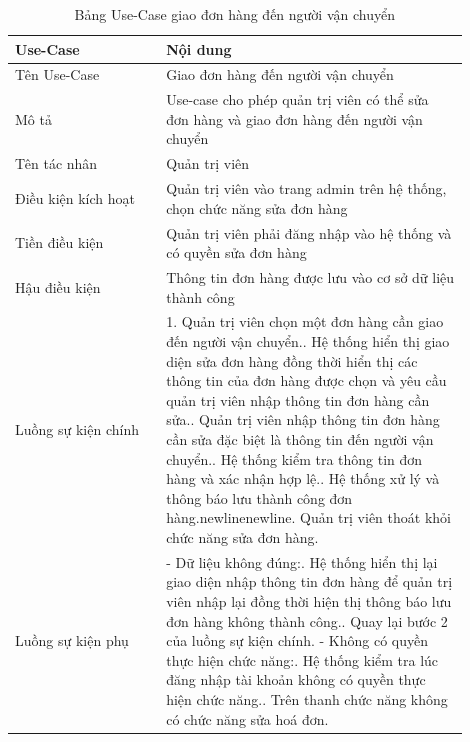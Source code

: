 \begin{longtable}[htp]{ |m{0.3\linewidth}|m{0.6\linewidth}|}
 \caption{Bảng Use-Case giao đơn hàng đến người vận chuyển \label{long}}\\
 \hline
 Use-Case & Nội dung \\
 \hline
 Tên Use-Case & Giao đơn hàng đến người vận chuyển \\
 \hline
 Mô tả & Use-case cho phép quản trị viên có thể sửa đơn hàng và giao đơn hàng đến người vận chuyển\\
 \hline
 Tên tác nhân & Quản trị viên\\
 \hline
 Điều kiện kích hoạt & Quản trị viên vào trang admin trên hệ thống, chọn chức năng sửa đơn hàng\\
 \hline
 Tiền điều kiện & Quản trị viên phải đăng nhập vào hệ thống và có quyền sửa đơn hàng\\
 \hline
 Hậu điều kiện & Thông tin đơn hàng được lưu vào cơ sở dữ liệu thành công\\
 \hline
 Luồng sự kiện chính & 
 1. Quản trị viên chọn một đơn hàng cần giao đến người vận chuyển.\newline
 2. Hệ thống hiển thị giao diện sửa đơn hàng đồng thời hiển thị các thông tin của đơn hàng được chọn và yêu cầu quản trị viên nhập thông tin đơn hàng cần sửa.\newline
 3. Quản trị viên nhập thông tin đơn hàng cần sửa đặc biệt là thông tin đến người vận chuyển.\newline	
 4. Hệ thống kiểm tra thông tin đơn hàng và xác nhận hợp lệ.\newline
 5. Hệ thống xử lý và thông báo lưu thành công đơn hàng.newlinenewline\newline
 6. Quản trị viên thoát khỏi chức năng sửa đơn hàng.
 \\
 \hline
 Luồng sự kiện phụ & 
 - Dữ liệu không đúng:\newline
  1. Hệ thống hiển thị lại giao diện nhập thông tin đơn hàng để quản trị viên nhập lại đồng thời hiện thị thông báo lưu đơn hàng không thành công.\newline
  2. Quay lại bước 2 của luồng sự kiện chính.\newline
  - Không có quyền thực hiện chức năng:\newline
  1. Hệ thống kiểm tra lúc đăng nhập tài khoản không có quyền thực hiện chức năng.\newline
  2. Trên thanh chức năng không có chức năng sửa hoá đơn.
 \\
 \hline
\end{longtable}
\newpage
